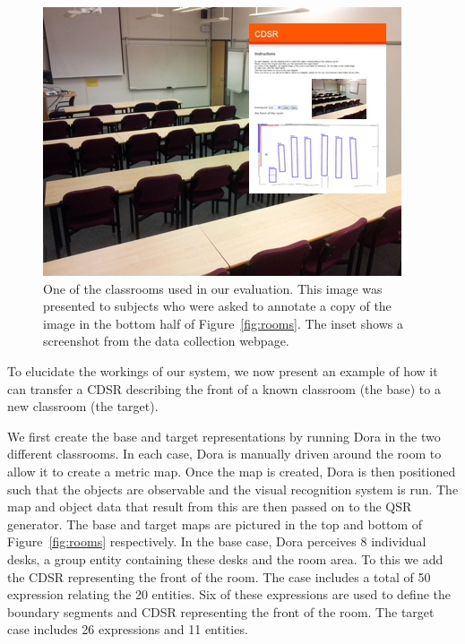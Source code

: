 \documentclass[letterpaper]{article}
\begin{document}
\begin{figure}
  \includegraphics[width=\columnwidth]{images/ug40.png}
  \caption{One of the classrooms used in our evaluation. This image was presented to subjects who were asked to annotate a copy of the image in the bottom half of Figure~\ref{fig:rooms}. The inset shows a screenshot from the data collection webpage.}
  \label{fig:ug40}
\end{figure}



To elucidate the workings of our system, we now present an example of how it can transfer a CDSR describing the front of a known classroom (the base) to a new classroom (the target). 

We first create the base and target representations by running Dora in the two different classrooms. In each case, Dora is manually driven around the room to allow it to create a metric map. Once the map is created, Dora is then positioned such that the objects are observable and the visual recognition system is run. The map and object data that result from this are then passed on to the QSR generator. The base and target maps are pictured in the top and bottom of Figure~\ref{fig:rooms} respectively. In the base case, Dora perceives 8 individual desks, a group entity containing these desks and the room area. To this we add the CDSR representing the front of the room. The case includes a total of 50 expression relating the 20 entities. Six of these expressions are used to define the boundary segments and CDSR representing the front of the room. The target case includes 26 expressions and 11 entities.
\end{document}

